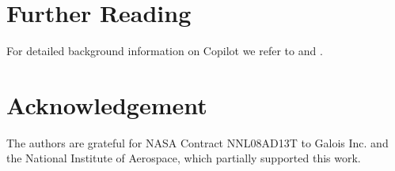 \documentclass[]{article}
\theoremstyle{example}
\begin{document}




\section*{Further Reading}

For detailed background information on Copilot we refer to \cite{PikeGoodloe2010} and \cite{PikeGoodloe2011}.

\section*{Acknowledgement}

The authors are grateful for NASA Contract NNL08AD13T to Galois Inc. and the
National Institute of Aerospace, which partially supported this work.

{


}
\end{document}
